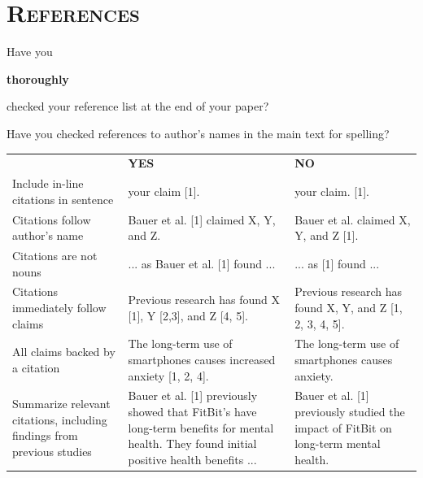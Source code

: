 \noindent\makebox[\linewidth]{\rule{\linewidth}{0.4pt}}
\section*{\textsc{References}}
\vspace{0.5cm}

\begin{checklist}
	\item Have you \begin{em}\textbf{thoroughly}\end{em} checked your reference list at the end of your paper?
	\item Have you checked references to author's names in the main text for spelling?
\end{checklist}

\begin{center}

\small %
\def\arraystretch{2}
\begin{tabular}{p{6cm} p{5cm} p{5cm}}
& \textbf{YES} & \textbf{NO} \\
 \cmidrule{2-2}  \cmidrule{3-3} 
Include in-line citations in sentence & your claim [1]. & your claim. [1]. \\
Citations follow author's name & Bauer et al. [1] claimed X, Y, and Z. & Bauer et al. claimed X, Y, and Z [1]. \\
Citations are not nouns & ... as Bauer et al. [1] found ... & ... as [1] found ... \\
Citations immediately follow claims & Previous research has found X [1], Y [2,3], and Z [4, 5]. &  Previous research has found X, Y, and Z [1, 2, 3, 4, 5]. \\
All claims backed by a citation & The long-term use of smartphones causes increased anxiety [1, 2, 4]. & The long-term use of smartphones causes anxiety.  \\
Summarize relevant citations, including findings from previous studies & Bauer et al. [1] previously showed that FitBit's have long-term benefits for mental health. They found initial positive health benefits ... & Bauer et al. [1] previously studied the impact of FitBit on long-term mental health. \\
\end{tabular}
\end{center}


